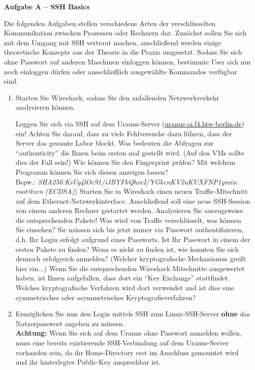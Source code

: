 \documentclass[paper=a4,fontsize=11pt]{scrartcl}%
\numberwithin{equation}{section}
\begin{document}
\begin{center}\Large{\textbf{Aufgabe A -- SSH Basics}}\end{center}\vskip0.25in
Die folgenden Aufgaben stellen verschiedene Arten der verschlüsselten Kommunikation zwischen Prozessen oder Rechnern dar. Zunächst sollen Sie sich mit dem Umgang mit SSH vertraut machen, anschließend werden einige theoretische Konzepte aus der Theorie in die Praxis umgesetzt. Sodass Sie sich ohne Passwort auf anderen Maschinen einloggen können, bestimmte User sich nur noch einloggen dürfen oder ausschließlich ausgewählte Kommandos verfügbar sind. 
\begin{enumerate}
\item Starten Sie Wireshark, sodass Sie den anfallenden Netzwerkverkehr analysieren können.
\begin{tasks}
	\task Loggen Sie sich via SSH auf dem Uranus-Server (\url{uranus-ai.f4.htw-berlin.de}) ein! Achten Sie darauf, dass zu viele Fehlversuche dazu führen, dass der Server das gesamte Labor blockt.
	\task Was bedeuten die Abfragen zur \enquote{authenticity} die Ihnen beim ersten mal gestellt wird. (Auf den VMs sollte dies der Fall sein!)
	\task Wie können Sie den Fingerprint prüfen? Mit welchem Programm können Sie sich diesen anzeigen lassen?\\
	Bspw.: \small{ \emph{SHA256:KsUg4lOc91/iJBYFkQhxeI/YGkcnKV2uKUXFNP1ymiw root@xen (ECDSA)}})
	\task Starten Sie in Wireshark einen neuen Traffic-Mitschnitt auf dem Ethernet-Netzwerkinterface. Anschließend soll eine neue SSH-Session von einem anderen Rechner gestartet werden. Analysieren Sie auszugsweise die entsprechenden Pakete! Was wird von Traffic verschlüsselt, was können Sie einsehen? 
	\task Sie müssen sich bis jetzt immer via Passwort authentifizieren, d.h. Ihr Login erfolgt aufgrund eines Passworts. Ist Ihr Passwort in einem der ersten Pakete zu finden? Wenn es nicht zu finden ist, wie konnten Sie sich dennoch erfolgreich anmelden? (Welcher kryptografische Mechanismus greift hier ein...)
	\task Wenn Sie die entsprechenden Wireshark Mitschnitte ausgewertet haben, ist Ihnen aufgefallen, dass dort ein \enquote{Key Exchange} stattfindet. Welches kryptografische Verfahren wird dort verwendet und ist dies eine symmetrisches oder asymmetrisches Kryptografieverfahren?
\end{tasks}
	\item Ermöglichen Sie nun den Login mittels SSH zum Linux-SSH-Server \textbf{ohne} das Nutzerpasswort angeben zu müssen.\\
	\textbf{Achtung:} Wenn Sie sich auf dem Uranus ohne Passwort anmelden wollen, muss eine bereits existierende SSH-Verbindung auf dem Uranus-Server vorhanden sein, da ihr Home-Directory erst im Anschluss gemountet wird und ihr hinterlegter Public-Key ansprechbar ist.

\end{enumerate}
\end{document}
